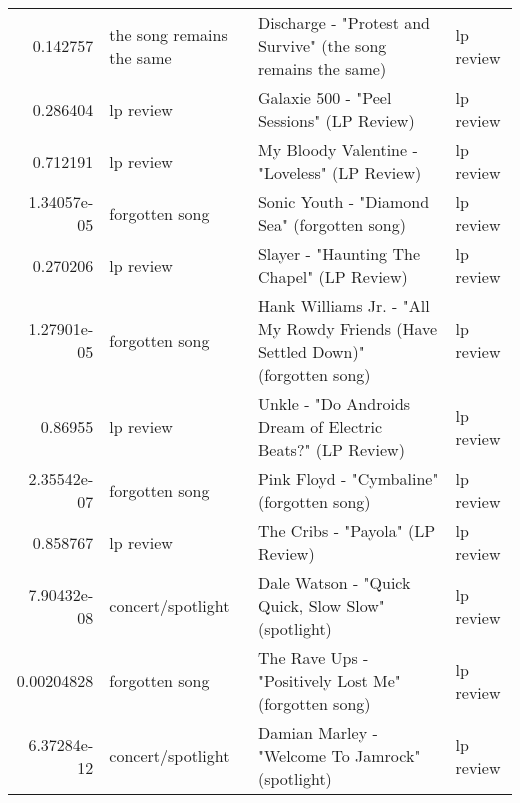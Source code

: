 \documentclass[letterpaper,10pt]{article}
\begin{document}
\begin{table}[H]
\begin{adjustbox}{max width=\linewidth}
\begin{tabular}{rlll}
  0.142757    & the song remains the same & Discharge - "Protest and Survive" (the song remains the same)                                                & lp review                 \\
  0.286404    & lp review                 & Galaxie 500 - "Peel Sessions" (LP Review)                                                                    & lp review                 \\
  0.712191    & lp review                 & My Bloody Valentine - "Loveless" (LP Review)                                                                 & lp review                 \\
  1.34057e-05 & forgotten song            & Sonic Youth - "Diamond Sea" (forgotten song)                                                                 & lp review                 \\
  0.270206    & lp review                 & Slayer - "Haunting The Chapel" (LP Review)                                                                   & lp review                 \\
  1.27901e-05 & forgotten song            & Hank Williams Jr. - "All My Rowdy Friends (Have Settled Down)" (forgotten song)                              & lp review                 \\
  0.86955     & lp review                 & Unkle - "Do Androids Dream of Electric Beats?" (LP Review)                                                   & lp review                 \\
  2.35542e-07 & forgotten song            & Pink Floyd - "Cymbaline" (forgotten song)                                                                    & lp review                 \\
  0.858767    & lp review                 & The Cribs - "Payola" (LP Review)                                                                             & lp review                 \\
  7.90432e-08 & concert/spotlight         & Dale Watson - "Quick Quick, Slow Slow" (spotlight)                                                           & lp review                 \\
  0.00204828  & forgotten song            & The Rave Ups - "Positively Lost Me" (forgotten song)                                                         & lp review                 \\
  6.37284e-12 & concert/spotlight         & Damian Marley - "Welcome To Jamrock" (spotlight)                                                             & lp review                 \\

\end{tabular}
\end{adjustbox}
\end{table}
\end{document}
